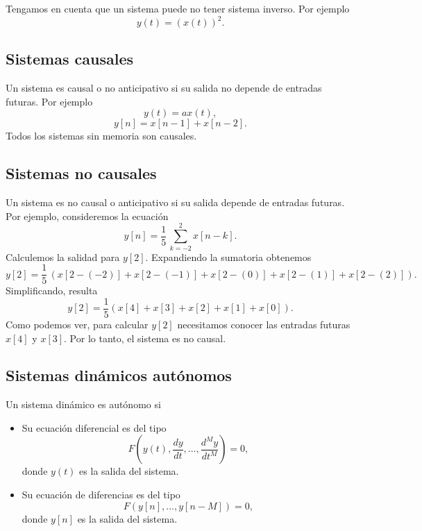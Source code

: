 Tengamos en cuenta que un sistema puede no tener sistema inverso. Por
ejemplo
\begin{equation}
  y(t)=\left( x(t)\right) ^{2}.
\end{equation}

\subsection{Sistemas causales}

Un sistema es causal o no anticipativo si su salida no depende de
entradas futuras. Por ejemplo
\begin{equation}
  y\left( t\right) =ax\left( t\right),
\end{equation}
\begin{equation}
  y\left[ n\right] =x\left[ n-1\right] +x\left[ n-2\right] .
\end{equation}
Todos los sistemas sin memoria son causales.

\subsection{Sistemas no causales}

Un sistema es no causal o anticipativo si su salida depende de
entradas futuras. Por ejemplo, consideremos la ecuaci\'{o}n
\begin{equation}
  y\left[ n\right] =\frac{1}{5} \, \sum_{k=-2}^{2}x\left[ n-k\right] .
\end{equation}
Calculemos la salidad para $y[2]$. Expandiendo la sumatoria obtenemos
\begin{equation}
  y[2] = \frac{1}{5} \, \left( x[2-(-2)] + x[2-(-1)] + x[2-(0)] + x[2-(1)] + x[2-(2)] \right).
\end{equation}
Simplificando, resulta
\begin{equation}
  y[2] = \frac{1}{5} \left( x[4] + x[3] + x[2] + x[1] + x[0] \right).
\end{equation}
Como podemos ver, para calcular $y[2]$ necesitamos conocer las
entradas futuras $x[4]$ y $x[3]$. Por lo tanto, el sistema es no causal.

\subsection{Sistemas din\'{a}micos aut\'{o}nomos}

Un sistema din\'{a}mico es aut\'{o}nomo si
\begin{itemize}
\item Su ecuaci\'{o}n diferencial es del tipo
  \begin{equation}
    F(y(t), \frac{dy}{dt},..., \frac{d^{M}y}{dt^{M}}) = 0,                  
  \end{equation}
  donde $y(t)$ es la salida del sistema.

\item Su ecuaci\'{o}n de diferencias es del tipo
  \begin{equation}
    F(y[n], ..., y[n-M]) = 0, 
  \end{equation}
  donde $y[n]$ es la salida del sistema.
\end{itemize}

